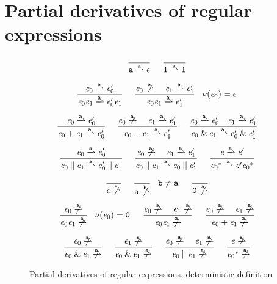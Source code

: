 \section{Partial derivatives of regular expressions}\label{sec:regexp-par}

\begin{figure}
 $$
  \begin{array}{c}
   \simpleRule{}{\sym\parDer{\sym}\eps}{}\quad
   \simpleRule{}{\all\parDer{\sym}\all}{}                                                                                   \\[4ex]
   \simpleRule{\re_0\parDer{\sym}\re'_0}{\re_0\catop\re_1\parDer{\sym}\re'_0\catop\re_1}{}\quad
   \simpleRule{\re_0\noParDer{\sym}\quad\re_1\parDer{\sym}\re'_1}{\re_0\catop\re_1\parDer{\sym}\re'_1}{\hasEps{\re_0}=\eps} \\[4ex]
   \simpleRule{\re_0\parDer{\sym}\re'_0}{\re_0\orop\re_1\parDer{\sym}\re'_0}{}\quad
   \simpleRule{\re_0\noParDer{\sym}\quad\re_1\parDer{\sym}\re'_1}{\re_0\orop\re_1\parDer{\sym}\re'_1}{}\quad
   \simpleRule{\re_0\parDer{\sym}\re'_0\quad\re_1\parDer{\sym}\re'_1}{\re_0\andop\re_1\parDer{\sym}\re'_0\andop\re'_1}{}    \\[4ex]
   \simpleRule{\re_0\parDer{\sym}\re'_0}{\re_0\shuffleop\re_1\parDer{\sym}\re'_0\shuffleop\re_1}{}\quad
   \simpleRule{\re_0\noParDer{\sym}\quad\re_1\parDer{\sym}\re'_1}{\re_0\shuffleop\re_1\parDer{\sym}\re_0\shuffleop\re'_1}{}\quad
   \simpleRule{\re\parDer{\sym}\re'}{\starop{\re_0}\parDer{\sym}\re'\starop{\re_0}}{}                                       \\[4ex]
   \simpleRule{}{\eps\noParDer{\sym}}{}\quad
   \simpleRule{}{\sym\noParDer{\asym}}{\asym\neq\sym}\quad
   \simpleRule{}{\none\noParDer{\sym}}{}                                                                                    \\[4ex]
   \simpleRule{\re_0\noParDer{\sym}}{\re_0\catop\re_1\noParDer{\sym}}{\hasEps{\re_0}=\none}\quad
   \simpleRule{\re_0\noParDer{\sym}\quad\re_1\noParDer{\sym}}{\re_0\catop\re_1\noParDer{\sym}}{} \quad
   \simpleRule{\re_0\noParDer{\sym}\quad\re_1\noParDer{\sym}}{\re_0\orop\re_1\noParDer{\sym}}{}                             \\[4ex]
   \simpleRule{\re_0\noParDer{\sym}}{\re_0\andop\re_1\noParDer{\sym}}{}\quad
   \simpleRule{\re_1\noParDer{\sym}}{\re_0\andop\re_1\noParDer{\sym}}{}\quad
   \simpleRule{\re_0\noParDer{\sym}\quad\re_1\noParDer{\sym}}{\re_0\shuffleop\re_1\noParDer{\sym}}{}\quad
   \simpleRule{\re\noParDer{\sym}}{\starop{\re_0}\noParDer{\sym}}{}
  \end{array}
 $$
 \caption{Partial derivatives of regular expressions, deterministic definition}
 \label{fig:reg-exp-par-der}
\end{figure}


